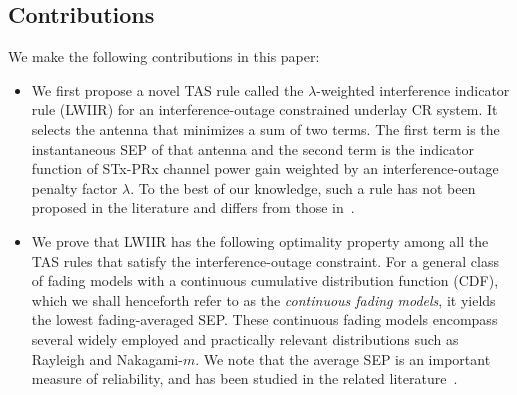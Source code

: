 \documentclass[12pt,draftcls,peerreview,onecolumn]{IEEEtran}
\newcommand{\lam}{\lambda}
\begin{document}
\subsection{Contributions} 
We make the following contributions in this paper:
\begin{itemize}
\item We first propose a novel TAS rule called the $\lam$-weighted interference indicator rule (LWIIR) for an interference-outage constrained %
underlay CR system. It selects the antenna that minimizes a sum of two terms. The first term is the instantaneous SEP of that antenna and the second term is the indicator function of STx-PRx channel power gain weighted by an interference-outage penalty factor $\lam$. To the best of our knowledge, such a rule has not been proposed in the literature and differs from those in~\cite{Wang_2011_TCom,Dmochowski_2011_CROWNCOM,Wang_2010_TWC}.

\item We prove that LWIIR has the following optimality property among all the TAS rules that satisfy the interference-outage constraint.  For a general class of fading models with a continuous cumulative distribution function (CDF), which we shall henceforth refer to as the {\em continuous fading models}, it yields the lowest fading-averaged SEP. These continuous fading models encompass several widely employed and practically relevant distributions such as Rayleigh and Nakagami-$m$. We note that the average SEP is an important measure of reliability, and has been studied in the related literature~\cite{Fakhan_2014_TSP,Kashyap_2014_TCOM,Sarvendranath_2013_TCOM,Sarvendranath_2014_TCOM,li_2011_pimrc,Suraweera_2010_TVT}. 


\end{itemize}
\end{document}
